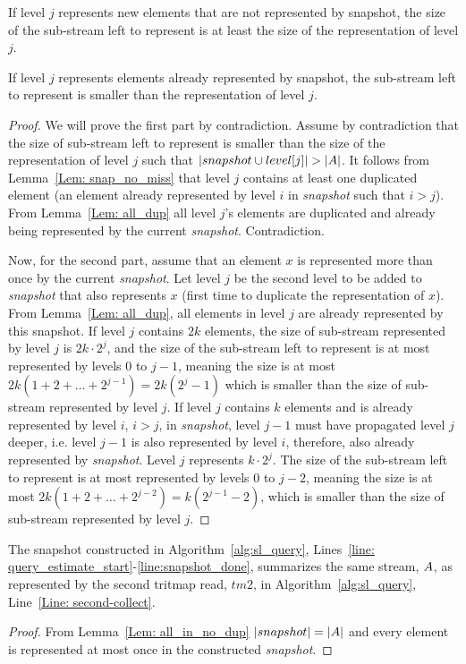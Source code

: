 \begin{lemma}\label{Lem: all_in_no_dup}
If level $j$ represents new elements that are not represented by snapshot, the size of the sub-stream left to represent is at least the size of the representation of level $j$.

If level $j$ represents elements already represented by snapshot, the sub-stream left to represent is smaller than the representation of level $j$.
\end{lemma}
\begin{proof}
We will prove the first part by contradiction. Assume by contradiction that the size of sub-stream left to represent is smaller than the size of the representation of level $j$ such that $|snapshot\cup level[j]| > |\mathnormal{A}|$. It follows from Lemma~\ref{Lem: snap_no_miss} that level $j$ contains at least one duplicated element (an element already represented by level $i$ in \emph{snapshot} such that $i>j$). From Lemma~\ref{Lem: all_dup} all level $j$'s elements are duplicated and already being represented by the current \emph{snapshot}. Contradiction. 

Now, for the second part, assume that an element $x$ is represented more than once by the current \emph{snapshot}. Let level $j$ be the second level to be added to \emph{snapshot} that also represents $x$ (first time to duplicate the representation of $x$). From Lemma~\ref{Lem: all_dup}, all elements in level $j$ are already represented by this snapshot.
If level $j$ contains $2k$ elements, the size of sub-stream represented by level $j$ is $2k\cdot2^j$, and the size of the sub-stream left to represent is at most represented by levels 0 to $j-1$, meaning the size is at most $2k(1+2+\dots+2^{j-1})=2k(2^j-1)$ which is smaller than the size of sub-stream represented by level $j$.
If level $j$ contains $k$ elements and is already represented by level $i$, $i>j$, in \emph{snapshot}, level $j-1$ must have propagated level $j$ deeper, i.e. level $j-1$ is also represented by level $i$, therefore, also already represented by \emph{snapshot}. Level $j$ represents $k\cdot2^j$. The size of the sub-stream left to represent is at most represented by levels 0 to $j-2$, meaning the size is at most $2k(1+2+\dots+2^{j-2})=k(2^{j-1}-2)$, which is smaller than the size of sub-stream represented by level $j$.
\end{proof}


\begin{lemma} \label{Lem: query_estimate}
The snapshot constructed in Algorithm~\ref{alg:sl_query}, Lines~\ref{line: query_estimate_start}-\ref{line:snapshot_done}, summarizes the same stream, $\mathnormal{A}$, as represented by the second tritmap read, $tm2$, in Algorithm~\ref{alg:sl_query}, Line~\ref{Line: second-collect}. 
\end{lemma}
\begin{proof}
From Lemma~\ref{Lem: all_in_no_dup} $|snapshot|=|\mathnormal{A}|$ and every element is represented at most once in the constructed \emph{snapshot}.
\end{proof}

